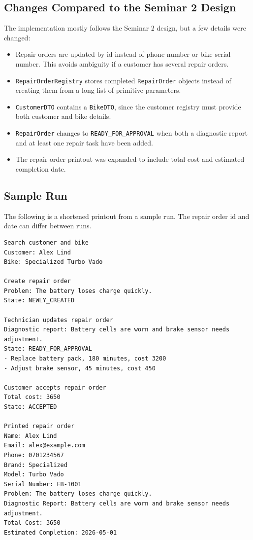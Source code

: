\documentclass[12pt]{article}
\begin{document}
\subsection{Changes Compared to the Seminar 2 Design}

The implementation mostly follows the Seminar 2 design, but a few details were changed:

\begin{itemize}[noitemsep]
    \item Repair orders are updated by id instead of phone number or bike serial number. This avoids ambiguity if a customer has several repair orders.
    \item \texttt{RepairOrderRegistry} stores completed \texttt{RepairOrder} objects instead of creating them from a long list of primitive parameters.
    \item \texttt{CustomerDTO} contains a \texttt{BikeDTO}, since the customer registry must provide both customer and bike details.
    \item \texttt{RepairOrder} changes to \texttt{READY\_FOR\_APPROVAL} when both a diagnostic report and at least one repair task have been added.
    \item The repair order printout was expanded to include total cost and estimated completion date.
\end{itemize}

\subsection{Sample Run}

The following is a shortened printout from a sample run. The repair order id and date can differ between runs.

\begin{lstlisting}
Search customer and bike
Customer: Alex Lind
Bike: Specialized Turbo Vado

Create repair order
Problem: The battery loses charge quickly.
State: NEWLY_CREATED

Technician updates repair order
Diagnostic report: Battery cells are worn and brake sensor needs adjustment.
State: READY_FOR_APPROVAL
- Replace battery pack, 180 minutes, cost 3200
- Adjust brake sensor, 45 minutes, cost 450

Customer accepts repair order
Total cost: 3650
State: ACCEPTED

Printed repair order
Name: Alex Lind
Email: alex@example.com
Phone: 0701234567
Brand: Specialized
Model: Turbo Vado
Serial Number: EB-1001
Problem: The battery loses charge quickly.
Diagnostic Report: Battery cells are worn and brake sensor needs adjustment.
Total Cost: 3650
Estimated Completion: 2026-05-01
\end{lstlisting}
\end{document}
